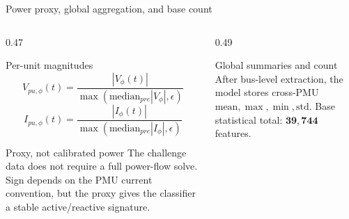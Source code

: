﻿\documentclass[10pt,aspectratio=169]{beamer}
\begin{document}
\fi
\begin{frame}{Power proxy, global aggregation, and base count}
\small
\begin{columns}[T,totalwidth=\textwidth]
\begin{column}{0.47\textwidth}
\begin{block}{Per-unit magnitudes}
\[
V_{pu,\phi}(t)=
\frac{|V_{\phi}(t)|}
{\max(\mathrm{median}_{pre}|V_{\phi}|,\epsilon)}
\]
\[
I_{pu,\phi}(t)=
\frac{|I_{\phi}(t)|}
{\max(\mathrm{median}_{pre}|I_{\phi}|,\epsilon)}
\]
\end{block}
\begin{alertblock}{Proxy, not calibrated power}
The challenge data does not require a full power-flow solve. Sign depends on the PMU current convention, but the proxy gives the classifier a stable active/reactive signature.
\end{alertblock}
\end{column}
\begin{column}{0.49\textwidth}
\centering
{}
\vspace{1mm}
\begin{exampleblock}{Global summaries and count}
After bus-level extraction, the model stores cross-PMU \(\mathrm{mean},\max,\min,\mathrm{std}\). Base statistical total: \(\mathbf{39{,}744}\) features.
\end{exampleblock}
\end{column}
\end{columns}
\end{frame}

\end{document}
